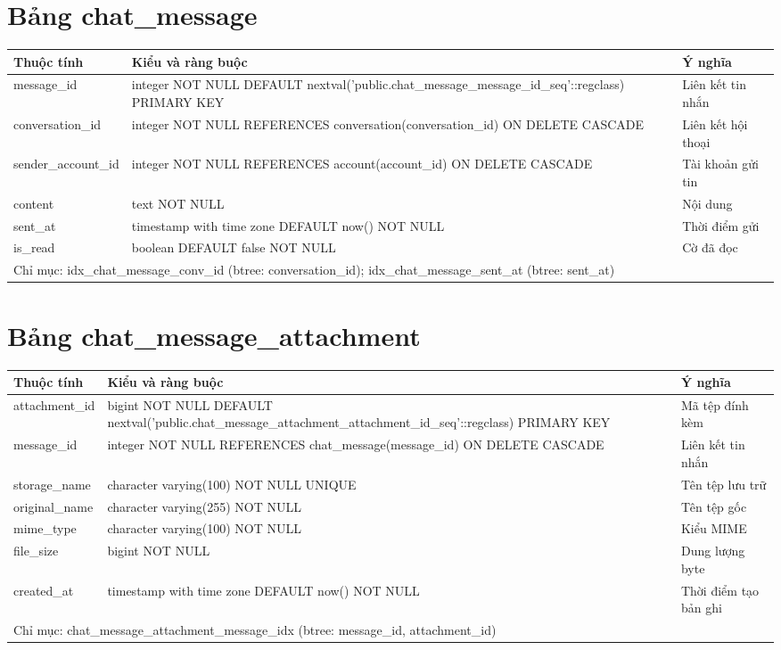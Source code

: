 \section{Bảng chat\_message}
\begin{longtable}{|p{}|p{}|p{}|}\hline
\textbf{Thuộc tính}&\textbf{Kiểu và ràng buộc}&\textbf{Ý nghĩa}\\\hline\endhead
message\_id & integer NOT NULL DEFAULT nextval('public.chat\_message\_message\_id\_seq'::regclass) PRIMARY KEY & Liên kết tin nhắn\\\hline
conversation\_id & integer NOT NULL REFERENCES conversation(conversation\_id) ON DELETE CASCADE & Liên kết hội thoại\\\hline
sender\_account\_id & integer NOT NULL REFERENCES account(account\_id) ON DELETE CASCADE & Tài khoản gửi tin\\\hline
content & text NOT NULL & Nội dung\\\hline
sent\_at & timestamp with time zone DEFAULT now() NOT NULL & Thời điểm gửi\\\hline
is\_read & boolean DEFAULT false NOT NULL & Cờ đã đọc\\\hline
\multicolumn{3}{|p{0.93\textwidth}|}{Chỉ mục: idx\_chat\_message\_conv\_id (btree: conversation\_id); idx\_chat\_message\_sent\_at (btree: sent\_at)}\\\hline
\end{longtable}
\normalsize
\section{Bảng chat\_message\_attachment}
\begin{longtable}{|p{}|p{}|p{}|}\hline
\textbf{Thuộc tính}&\textbf{Kiểu và ràng buộc}&\textbf{Ý nghĩa}\\\hline\endhead
attachment\_id & bigint NOT NULL DEFAULT nextval('public.chat\_message\_attachment\_attachment\_id\_seq'::regclass) PRIMARY KEY & Mã tệp đính kèm\\\hline
message\_id & integer NOT NULL REFERENCES chat\_message(message\_id) ON DELETE CASCADE & Liên kết tin nhắn\\\hline
storage\_name & character varying(100) NOT NULL UNIQUE & Tên tệp lưu trữ\\\hline
original\_name & character varying(255) NOT NULL & Tên tệp gốc\\\hline
mime\_type & character varying(100) NOT NULL & Kiểu MIME\\\hline
file\_size & bigint NOT NULL & Dung lượng byte\\\hline
created\_at & timestamp with time zone DEFAULT now() NOT NULL & Thời điểm tạo bản ghi\\\hline
\multicolumn{3}{|p{0.93\textwidth}|}{Chỉ mục: chat\_message\_attachment\_message\_idx (btree: message\_id, attachment\_id)}\\\hline
\end{longtable}
\normalsize
